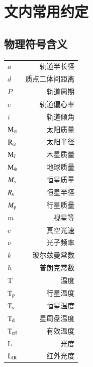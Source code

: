 
\chapter{文内常用约定} \label{apdx:nomenclature}
\section{物理符号含义} \label{apdx:symbol}
\begin{multicols}{2}
\begin{tabularx}{0.85\linewidth}{@{\extracolsep{\fill}}lr}
\centering
$a$      	     			&     轨道半长径 		\\
$d$      	     			&     质点二体间距离	 	\\
$P$      	     			&     轨道周期	 		\\
$e$      	     			&     轨道偏心率 		\\
$i$          	     			&     轨道倾角 			\\
$\mathrm{M}_\odot$          		&     太阳质量   			\\
$\mathrm{R}_\odot$          		&     太阳半径   			\\
$\mathrm{M}_\mathrm{J}$          		&     木星质量   			\\
$\mathrm{M}_\oplus$          	&     地球质量   			\\
$M_\mathrm{s}$          		&     恒星质量   			\\
$R_\mathrm{s}$          		&     恒星半径   			\\
$M_\mathrm{p}$         	 	&     行星质量   			\\
$m$         	 			&     视星等   			\\
$c$         	 			&     真空光速   			\\
$\nu$         	 		&     光子频率   			\\
$k$         	 			&     玻尔兹曼常数   		\\
$h$         	 			&     普朗克常数   		\\
T		       	 		&      温度   			\\
$\mathrm{T}_\mathrm{p}$         	 	&      行星温度   		\\
$\mathrm{T}_\mathrm{s}$         	 	&      恒星温度   		\\
$\mathrm{T}_\mathrm{d}$         	 	&      星周盘温度   		\\
$\mathrm{T}_\mathrm{eff}$         	 	&      有效温度   		\\
L		         	 	&      光度		   		\\
$\mathrm{L}_\mathrm{IR}$         	 	&      红外光度   		\\


\end{tabularx}
\end{multicols}
